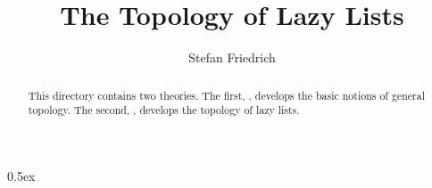 \documentclass[11pt,a4paper]{article}
\begin{document}
\title{The Topology of Lazy Lists}
\author{Stefan Friedrich}
\maketitle

\begin{abstract}
This directory contains two theories. The first, 
, develops the basic notions of general topology. The second,
, develops the topology of lazy lists.
\end{abstract}

\tableofcontents

\parindent 0pt\parskip 0.5ex





\end{document}
